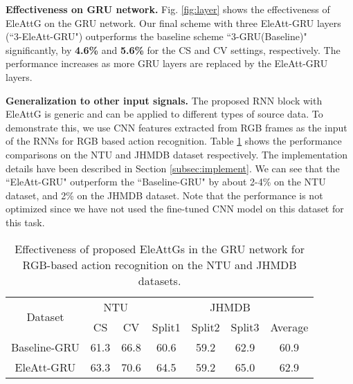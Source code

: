 \documentclass[runningheads]{llncs}
\newcommand{\EleAttGn}{{EleAttG}}
\begin{document}
\noindent\textbf{Effectiveness on GRU network.} Fig. \ref{fig:layer} shows the effectiveness of {\EleAttGn} on the GRU network. Our final scheme with three EleAtt-GRU layers (``3-EleAtt-GRU") outperforms the baseline scheme ``3-GRU(Baseline)" significantly, by {\bf{4.6\%}} and {\bf{5.6\%}} for the CS and CV settings, respectively. The performance increases as more GRU layers are replaced by the EleAtt-GRU layers.



\noindent\textbf{Generalization to other input signals.} The proposed RNN block with {\EleAttGn} is generic and can be applied to different types of source data. To demonstrate this, we use CNN features extracted from RGB frames as the input  of the RNNs for RGB based action recognition. Table \ref{tab:rgb} shows the performance comparisons on the NTU and JHMDB dataset respectively. The implementation details have been described in Section \ref{subsec:implement}. We can see that the ``EleAtt-GRU" outperform the ``Baseline-GRU" by about 2-4\% on the NTU dataset, and 2\% on the JHMDB dataset. Note that the performance is not optimized since we have not used the fine-tuned CNN model on this dataset for this task. 

\setlength{\tabcolsep}{7pt}
\begin{table}[t]
	\centering
\caption{Effectiveness of proposed {\EleAttGn}s in the GRU network for RGB-based action recognition on the NTU and JHMDB datasets.}
	\label{tab:rgb}
	\begin{tabular}{ccccccc}
		\toprule
		\multirow{2}{*}{Dataset} & \multicolumn{2}{c}{NTU} & \multicolumn{4}{c}{JHMDB}        \\
		\cmidrule(lr){2-3}
		\cmidrule(lr){4-7}
		& CS         & CV         & Split1 & Split2 & Split3 & Average  \\
		\midrule
		Baseline-GRU                & 61.3      & 66.8      & 60.6  & 59.2  & 62.9  & 60.9 \\
		EleAtt-GRU                    & 63.3      & 70.6      & 64.5  & 59.2  & 65.0  & 62.9 \\
		\bottomrule
	\end{tabular}
\end{table}
\end{document}
